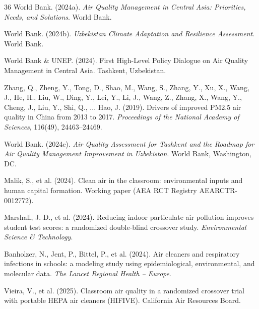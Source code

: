 \documentclass[11pt,a4paper]{article}
\begin{document}
\begin{thebibliography}{36}
World Bank. (2024a). \textit{Air Quality Management in Central Asia: Priorities, Needs, and Solutions}. World Bank.

World Bank. (2024b). \textit{Uzbekistan Climate Adaptation and Resilience Assessment}. World Bank.

World Bank \& UNEP. (2024). First High-Level Policy Dialogue on Air Quality Management in Central Asia. Tashkent, Uzbekistan.

Zhang, Q., Zheng, Y., Tong, D., Shao, M., Wang, S., Zhang, Y., Xu, X., Wang, J., He, H., Liu, W., Ding, Y., Lei, Y., Li, J., Wang, Z., Zhang, X., Wang, Y., Cheng, J., Liu, Y., Shi, Q., ... Hao, J. (2019). Drivers of improved PM2.5 air quality in China from 2013 to 2017. \textit{Proceedings of the National Academy of Sciences}, 116(49), 24463--24469.

World Bank. (2024c). \textit{Air Quality Assessment for Tashkent and the Roadmap for Air Quality Management Improvement in Uzbekistan}. World Bank, Washington, DC.

Malik, S., et al. (2024). Clean air in the classroom: environmental inputs and human capital formation. Working paper (AEA RCT Registry AEARCTR-0012772).

Marshall, J. D., et al. (2024). Reducing indoor particulate air pollution improves student test scores: a randomized double-blind crossover study. \textit{Environmental Science \& Technology}.

Banholzer, N., Jent, P., Bittel, P., et al. (2024). Air cleaners and respiratory infections in schools: a modeling study using epidemiological, environmental, and molecular data. \textit{The Lancet Regional Health -- Europe}.

Vieira, V., et al. (2025). Classroom air quality in a randomized crossover trial with portable HEPA air cleaners (HIFIVE). California Air Resources Board.

\end{thebibliography}
\end{document}

